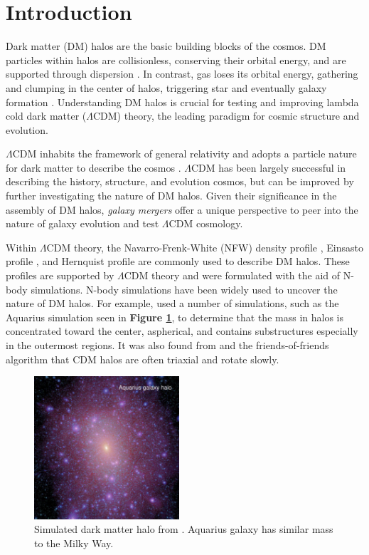 \section{Introduction}
Dark matter (DM) halos are the basic building blocks of the cosmos. DM particles within halos are collisionless, conserving their orbital energy, and are supported through dispersion \cite{Wetzel2015}. In contrast, gas loses its orbital energy, gathering and clumping in the center of halos, triggering star and eventually galaxy formation \cite{Frenk2012}. Understanding DM halos is crucial for testing and improving lambda cold dark matter ($\Lambda$CDM) theory, the leading paradigm for cosmic structure and evolution. 

$\Lambda$CDM inhabits the framework of general relativity and adopts a particle nature for dark matter to describe the cosmos \cite{Bullock2017}. $\Lambda$CDM has been largely successful in describing the history, structure, and evolution cosmos, but can be improved by further investigating the nature of DM halos. Given their significance in the assembly of DM halos, \textit{galaxy mergers} offer a unique perspective to peer into the nature of galaxy evolution and test $\Lambda$CDM cosmology.

Within $\Lambda$CDM theory, the Navarro-Frenk-White (NFW) density profile \cite{Navarro1997}, Einsasto profile \cite{Navarroetal2004}, and Hernquist profile \cite{Hernquist1990} are commonly used to describe DM halos. These profiles are supported by $\Lambda$CDM theory and were formulated with the aid of N-body simulations. N-body simulations have been widely used to uncover the nature of DM halos. For example, \cite{Frenk2012} used a number of simulations, such as the Aquarius simulation seen in \textbf{Figure \ref{Aquarius halo}}, to determine that the mass in halos is concentrated toward the center, aspherical, and contains substructures especially in the outermost regions. It was also found from \cite{Davis1985} and the friends-of-friends algorithm that CDM halos are often triaxial and rotate slowly.

\begin{figure}
  \begin{center}
    \includegraphics[width=0.48\textwidth]{Figures/Aquariushalo.png}
  \end{center}
  \caption{Simulated dark matter halo from \cite{Frenk2012}. Aquarius galaxy has similar mass to the Milky Way.}
  \label{Aquarius halo}
\end{figure}

